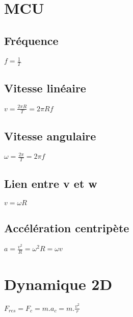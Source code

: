 \documentclass[a4paper, 12pt]{article}
\begin{document}
\section*{MCU}
\subsection*{Fréquence}
$f=\frac{1}{T}$

\subsection*{Vitesse linéaire}
$v=\frac{2\pi R}{T} = 2\pi R f$

\subsection*{Vitesse angulaire}
$\omega=\frac{2\pi}{T} = 2\pi f$

\subsection*{Lien entre v et w}
$v=\omega R$

\subsection*{Accélération centripète}
$a=\frac{v^2}{R} = \omega^2 R = \omega v$

\section*{Dynamique 2D}
$F_{res} = F_c = m.a_c = m.\frac{v^2}{r}$
\end{document}
